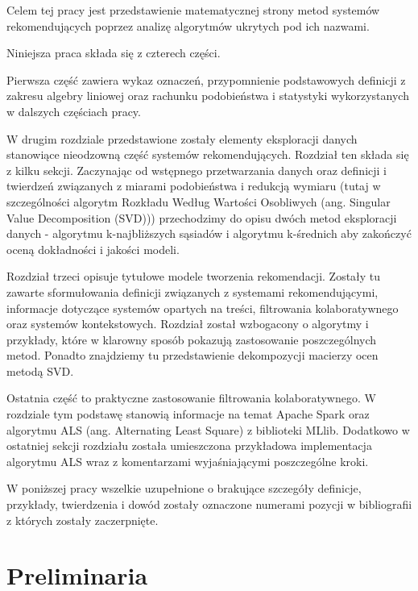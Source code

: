 \documentclass[12pt,a4paper]{report}
\begin{document}
Celem tej pracy jest przedstawienie matematycznej strony metod systemów rekomendujących poprzez analizę algorytmów ukrytych pod ich nazwami.

Niniejsza praca składa się z czterech części.

Pierwsza część zawiera wykaz oznaczeń, przypomnienie podstawowych definicji z zakresu algebry liniowej oraz rachunku podobieństwa i statystyki wykorzystanych w dalszych częściach pracy. 

W drugim rozdziale przedstawione zostały elementy eksploracji danych stanowiące nieodzowną część systemów rekomendujących. Rozdział ten składa się z kilku sekcji. Zaczynając od wstępnego przetwarzania danych oraz definicji i twierdzeń związanych z miarami podobieństwa i redukcją wymiaru (tutaj w szczególności algorytm Rozkładu Według Wartości Osobliwych (ang. Singular Value Decomposition (SVD))) przechodzimy do opisu dwóch metod eksploracji danych - algorytmu k-najbliższych sąsiadów i algorytmu k-średnich aby zakończyć oceną dokładności i jakości modeli.

Rozdział trzeci opisuje tytułowe modele tworzenia rekomendacji. Zostały tu zawarte sformułowania definicji związanych z systemami rekomendującymi, informacje dotyczące systemów opartych na treści, filtrowania kolaboratywnego oraz systemów kontekstowych. Rozdział został wzbogacony o algorytmy i przykłady, które w klarowny sposób pokazują zastosowanie poszczególnych metod. Ponadto znajdziemy tu przedstawienie dekompozycji macierzy ocen metodą SVD.

Ostatnia część to praktyczne zastosowanie filtrowania kolaboratywnego. W rozdziale tym podstawę stanowią informacje na temat Apache Spark oraz algorytmu ALS (ang. Alternating Least Square) z biblioteki MLlib. Dodatkowo w ostatniej sekcji rozdziału została umieszczona przykładowa implementacja algorytmu ALS wraz z komentarzami wyjaśniającymi poszczególne kroki. 

W poniższej pracy wszelkie uzupełnione o brakujące szczegóły definicje, przykłady, twierdzenia i dowód zostały oznaczone numerami pozycji w bibliografii z których zostały zaczerpnięte.


\chapter{Preliminaria} %
\end{document}
